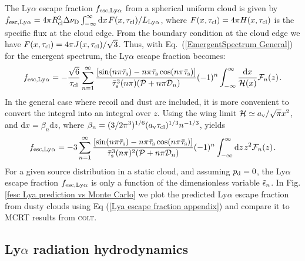 \documentclass[fleqn,usenatbib]{mnras}
\newcommand{\taucl}{\tau_{\rm cl}}
\begin{document}
The  Ly$\alpha$ escape fraction $f_{\rm esc, Ly\alpha}$ from a spherical uniform cloud is given by $f_{\rm esc, Ly\alpha} = 4\pi R_{\rm cl}^2 \Delta \nu_{\rm D} \int_{-\infty}^{\infty} \textrm{d}x \hspace{1 pt} F(x, \taucl)/L_{\rm Ly\alpha}$, where $F(x, \taucl) = 4\pi H(x, \taucl)$ is the specific flux at the cloud edge. From the boundary condition at the cloud edge we have $F(x,\taucl) = 4 \pi J(x, \taucl)/\sqrt{3}$. Thus, with Eq.~(\ref{EmergentSpectrum General}) for the emergent spectrum, the Ly$\alpha$ escape fraction becomes:
\begin{equation}
    f_{\rm esc, Ly\alpha} =  -\dfrac{\sqrt{6}}{ \taucl} \sum_{n=1}^{\infty}  \dfrac{ [\sin(n\pi \Bar{\tau}_{\rm s}) - n\pi \Bar{\tau}_{\rm s} \cos( n\pi \Bar{\tau}_{\rm s})] }{\Bar{\tau}_{\rm s}^3 (n \pi) (\mathcal{P} + n \pi \mathcal{D}_n)} (-1)^n \int_{-\infty}^{\infty} \dfrac{\textrm{d}x}{\mathcal{H}(x)} \mathcal{F}_n(z)  \hspace{1 pt} .
\end{equation}
In the general case where recoil and dust are included, it is more convenient to convert the integral into an integral over $z$. Using the wing limit $\mathcal{H} \simeq a_{\rm v}/\sqrt{\pi}x^2$, and $\textrm{d}x = \beta_n \textrm{d}z$, where $\beta_n = (3/2\pi^3)^{1/6} (a_{\rm v} \taucl)^{1/3} n^{-1/3}$, yields 
\begin{equation}
    f_{\rm esc, Ly\alpha} =  -3 \sum_{n=1}^{\infty}  \dfrac{ [\sin(n\pi \Bar{\tau}_{\rm s}) - n\pi \Bar{\tau}_{\rm s} \cos( n\pi \Bar{\tau}_{\rm s})] }{\Bar{\tau}_{\rm s}^3 (n \pi)^2 (\mathcal{P} + n \pi \mathcal{D}_n)} (-1)^n \int_{-\infty}^{\infty} \textrm{d}z \hspace{1 pt} z^2 \mathcal{F}_n(z)  \hspace{1 pt} \label{Lya escape fraction appendix}.
\end{equation}
For a given source distribution in a static cloud, and assuming $p_{\rm d} = 0$, the Ly$\alpha$ escape fraction $f_{\rm esc, Ly\alpha}$ is only a function of the dimensionless variable $\Tilde{\epsilon}_n$. In Fig. \ref{fesc Lya prediction vs Monte Carlo} we plot the predicted Ly$\alpha$ escape fraction from dusty clouds using Eq (\ref{Lya escape fraction appendix}) and compare it to MCRT results from \textsc{colt}.  

\subsection{Ly\texorpdfstring{\boldmath$\alpha$}{alpha} radiation hydrodynamics}
\label{AppendixRadPressure}
\end{document}
